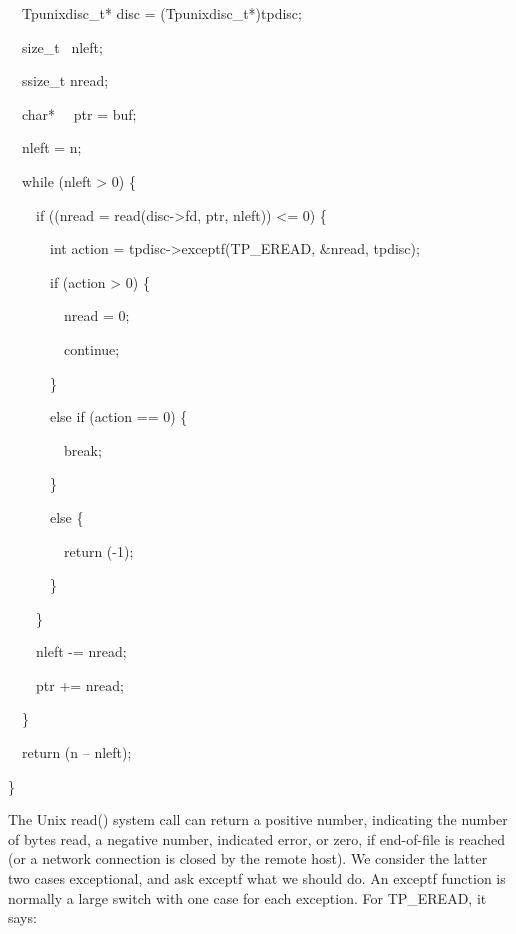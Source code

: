 {\ttfamily\mdseries
\ \ Tpunixdisc\_t* disc = (Tpunixdisc\_t*)tpdisc;}


\bigskip

{\ttfamily\mdseries
\ \ size\_t \ nleft;}

{\ttfamily\mdseries
\ \ ssize\_t nread;}

{\ttfamily\mdseries
\ \ char* \ \ ptr = buf;}


\bigskip

{\ttfamily\mdseries
\ \ nleft = n;}

{\ttfamily\mdseries
\ \ while (nleft {\textgreater} 0) \{}

{\ttfamily\mdseries
\ \ \ \ if ((nread = read(disc-{\textgreater}fd, ptr, nleft)) {\textless}= 0) \{}

{\ttfamily\mdseries
\ \ \ \ \ \ int action = tpdisc-{\textgreater}exceptf(TP\_EREAD, \&nread, tpdisc);}

{\ttfamily\mdseries
\ \ \ \ \ \ if (action {\textgreater} 0) \{}

{\ttfamily\mdseries
\ \ \ \ \ \ \ \ nread = 0;}

{\ttfamily\mdseries
\ \ \ \ \ \ \ \ continue;}

{\ttfamily\mdseries
\ \ \ \ \ \ \}}

{\ttfamily\mdseries
\ \ \ \ \ \ else if (action == 0) \{}

{\ttfamily\mdseries
\ \ \ \ \ \ \ \ break;}

{\ttfamily\mdseries
\ \ \ \ \ \ \}}

{\ttfamily\mdseries
\ \ \ \ \ \ else \{}

{\ttfamily\mdseries
\ \ \ \ \ \ \ \ return (-1);}

{\ttfamily\mdseries
\ \ \ \ \ \ \}}

{\ttfamily\mdseries
\ \ \ \ \}}


\bigskip

{\ttfamily\mdseries
\ \ \ \ nleft -= nread;}

{\ttfamily\mdseries
\ \ \ \ ptr += nread;}

{\ttfamily\mdseries
\ \ \}}

{\ttfamily\mdseries
\ \ return (n -- nleft);}

{\ttfamily\mdseries
\}}


The Unix read() system call can return a positive number, indicating
the number of bytes read, a negative number, indicated error, or zero,
if end-of-file is reached (or a network connection is closed by the
remote host). We consider the latter two cases exceptional, and ask
exceptf what we should do. An exceptf function is normally a large
switch with one case for each exception. For TP\_EREAD, it says:

